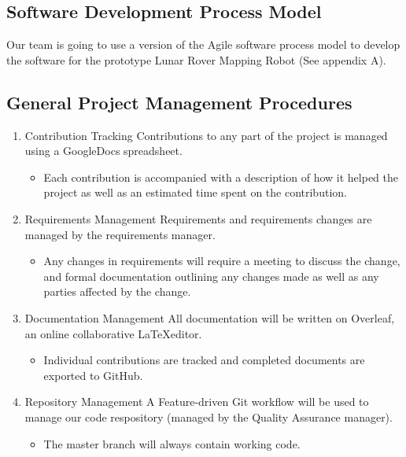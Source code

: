 \documentclass[11pt, a4paper]{article}
\begin{document}
\begin{flushleft}
  \subsection{Software Development Process Model}
  Our team is going to use a version of the Agile software process model to develop the software for the prototype Lunar Rover Mapping Robot (See appendix A).
  
  \subsection{General Project Management Procedures}
  \begin{enumerate}
  	\item Contribution Tracking
    	\linebreak Contributions to any part of the project is managed using a GoogleDocs spreadsheet. 
        \begin{itemize}
        \item Each contribution is accompanied with a description of how it helped the project as well as an estimated time spent on the contribution.
        \end{itemize}
  	\item Requirements Management
    	\linebreak Requirements and requirements changes are managed by the requirements manager. 
        \begin{itemize}
        \item Any changes in requirements will require a meeting to discuss the change, and formal documentation outlining any changes made as well as any parties affected by the change.
        \end{itemize}
    \item Documentation Management
    	\linebreak All documentation will be written on Overleaf, an online collaborative \LaTeX editor. 
        \begin{itemize}
        \item Individual contributions are tracked and completed documents are exported to GitHub.
        \end{itemize}
    \item Repository Management
    	\linebreak A Feature-driven Git workflow will be used to manage our code respository (managed by the Quality Assurance manager).
        \begin{itemize}
        	\item The master branch will always contain working code.

\end{itemize}
\end{enumerate}
\end{flushleft}
\end{document}
